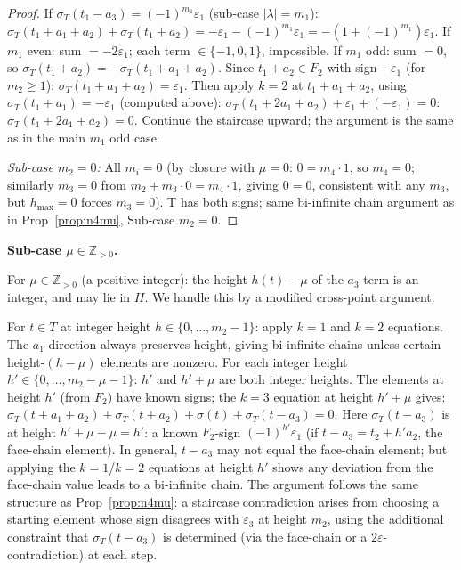 \documentclass{article}
\begin{document}
\begin{proof}
If $\sigma_T(t_1-a_3)=(-1)^{m_1}\varepsilon_1$ (sub-case $|\lambda|=m_1$):
$\sigma_T(t_1+a_1+a_2)+\sigma_T(t_1+a_2)=-\varepsilon_1-(-1)^{m_1}\varepsilon_1=-(1+(-1)^{m_1})\varepsilon_1$.
If $m_1$ even: sum $=-2\varepsilon_1$; each term $\in\{-1,0,1\}$, impossible.
If $m_1$ odd: sum $=0$, so $\sigma_T(t_1+a_2)=-\sigma_T(t_1+a_1+a_2)$.
Since $t_1+a_2\in F_2$ with sign $-\varepsilon_1$ (for $m_2\ge 1$):
$\sigma_T(t_1+a_1+a_2)=\varepsilon_1$.
Then apply $k=2$ at $t_1+a_1+a_2$, using $\sigma_T(t_1+a_1)=-\varepsilon_1$ (computed above):
$\sigma_T(t_1+2a_1+a_2)+\varepsilon_1+(-\varepsilon_1)=0$: $\sigma_T(t_1+2a_1+a_2)=0$.
Continue the staircase upward; the argument is the same as in the main $m_1$ odd case.

\textit{Sub-case $m_2=0$:}
All $m_i=0$ (by closure with $\mu=0$: $0=m_4\cdot 1$, so $m_4=0$; similarly $m_3=0$ from $m_2+m_3\cdot 0=m_4\cdot 1$, giving $0=0$, consistent with any $m_3$, but $h_{\max}=0$ forces $m_3=0$).
T has both signs; same bi-infinite chain argument as in Prop~\ref{prop:n4mu}, Sub-case $m_2=0$.
\end{proof}

\medskip
\noindent\textbf{Sub-case $\mu\in\mathbb{Z}_{>0}$.}

For $\mu\in\mathbb{Z}_{>0}$ (a positive integer): the height $h(t)-\mu$ of the $a_3$-term
is an integer, and may lie in $H$.  We handle this by a modified cross-point argument.

For $t\in T$ at integer height $h\in\{0,\dots,m_2-1\}$: apply $k=1$ and $k=2$ equations.
The $a_1$-direction always preserves height, giving bi-infinite chains unless certain
height-$(h-\mu)$ elements are nonzero.  For each integer height $h'\in\{0,\dots,m_2-\mu-1\}$:
$h'$ and $h'+\mu$ are both integer heights.  The elements at height $h'$ (from $F_2$)
have known signs; the $k=3$ equation at height $h'+\mu$ gives:
$\sigma_T(t+a_1+a_2)+\sigma_T(t+a_2)+\sigma(t)+\sigma_T(t-a_3)=0$.
Here $\sigma_T(t-a_3)$ is at height $h'+\mu-\mu=h'$: a known $F_2$-sign
$(-1)^{h'}\varepsilon_1$ (if $t-a_3=t_2+h'a_2$, the face-chain element).
In general, $t-a_3$ may not equal the face-chain element; but applying the $k=1$/$k=2$
equations at height $h'$ shows any deviation from the face-chain value leads to
a bi-infinite chain.  The argument follows the same structure as Prop~\ref{prop:n4mu}:
a staircase contradiction arises from choosing a starting element whose sign disagrees
with $\varepsilon_3$ at height $m_2$, using the additional constraint that $\sigma_T(t-a_3)$
is determined (via the face-chain or a $2\varepsilon$-contradiction) at each step.
\end{document}
